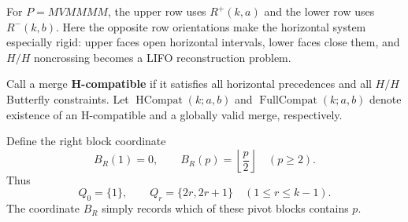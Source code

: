 \documentclass[11pt]{article}
\theoremstyle{definition}
\theoremstyle{remark}
\begin{document}
For \(P=MVMMMM\), the upper row uses \(R^+(k,a)\) and the lower row uses
\(R^-(k,b)\). Here the opposite row orientations make the horizontal
system especially rigid: upper faces open horizontal intervals, lower
faces close them, and \(H/H\) noncrossing becomes a LIFO reconstruction
problem.

Call a merge \textbf{H-compatible} if it satisfies all horizontal
precedences and all \(H/H\) Butterfly constraints. Let
\(\operatorname{HCompat}(k;a,b)\) and
\(\operatorname{FullCompat}(k;a,b)\) denote existence of an H-compatible
and a globally valid merge, respectively.

Define the right block coordinate \[
B_R(1)=0,\qquad
B_R(p)=\left\lfloor\frac p2\right\rfloor\quad(p\ge2).
\] Thus \[
Q_0=\{1\},\qquad Q_r=\{2r,2r+1\}\quad(1\le r\le k-1).
\] The coordinate \(B_R\) simply records which of these pivot blocks
contains \(p\).
\end{document}
